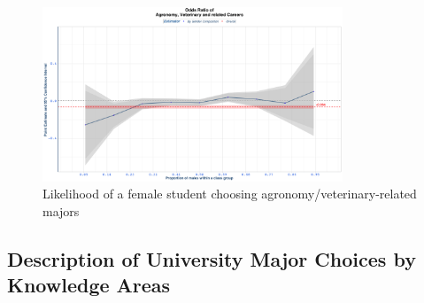  
\begin{figure}[H]
\centering
\includegraphics[width=0.8\textwidth]{Graph/Results/fe_panel_student_gender_composition_wome_in_AGRONOMY_VETERINARY_RELATED_bce.png}
\caption{Likelihood of a female student choosing agronomy/veterinary-related majors}
\label{fig:agronomy_veterinary_related}
\end{figure}

\subsection{Description of University Major Choices by Knowledge Areas} \label{app:path}

